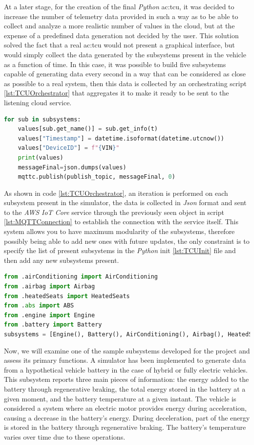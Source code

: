 At a later stage, for the creation of the final \textit{Python} \gls{ac:tcu}, it was decided to increase the number of telemetry data provided in such a way as to be able to collect and analyze a more realistic number of values in the cloud, but at the expense of a predefined data generation not decided by the user. This solution solved the fact that a real \gls{ac:tcu} would not present a graphical interface, but would simply collect the data generated by the subsystems present in the vehicle as a function of time. In this case, it was possible to build five subsystems capable of generating data every second in a way that can be considered as close as possible to a real system, then this data is collected by an orchestrating script \ref{lst:TCUOrchestrator} that aggregates it to make it ready to be sent to the listening cloud service.
\begin{lstlisting}[language=Python, caption={\gls{ac:tcu} orchestrator that collects data from other subsystems}, label=lst:TCUOrchestrator]
for sub in subsystems:
    values[sub.get_name()] = sub.get_info(t)
    values["Timestamp"] = datetime.isoformat(datetime.utcnow())
    values["DeviceID"] = f"{VIN}"
    print(values)
    messageFinal=json.dumps(values)
    mqttc.publish(publish_topic, messageFinal, 0)    
\end{lstlisting}

As shown in code \ref{lst:TCUOrchestrator}, an iteration is performed on each subsystem present in the simulator, the data is collected in \textit{Json} format and sent to the \textit{AWS IoT Core} service through the previously seen object in script \ref{lst:MQTTConnection} to establish the connection with the service itself. This system allows you to have maximum modularity of the subsystems, therefore possibly being able to add new ones with future updates, the only constraint is to specify the list of present subsystems in the \textit{Python} init \ref{lst:TCUInit} file and then add any new subsystems present.
\begin{lstlisting}[language=Python, caption={TCU init file for the import of the TCU subsystems}, label=lst:TCUInit]
from .airConditioning import AirConditioning
from .airbag import Airbag
from .heatedSeats import HeatedSeats
from .abs import ABS
from .engine import Engine
from .battery import Battery
subsystems = [Engine(), Battery(), AirConditioning(), Airbag(), HeatedSeats(), ABS()]  
\end{lstlisting}

Now, we will examine one of the sample subsystems developed for the project and assess its primary functions. A simulator has been implemented to generate data from a hypothetical vehicle battery in the case of hybrid or fully electric vehicles. This subsystem reports three main pieces of information: the energy added to the battery through regenerative braking, the total energy stored in the battery at a given moment, and the battery temperature at a given instant. The vehicle is considered a system where an electric motor provides energy during acceleration, causing a decrease in the battery's energy. During deceleration, part of the energy is stored in the battery through regenerative braking. The battery's temperature varies over time due to these operations.


